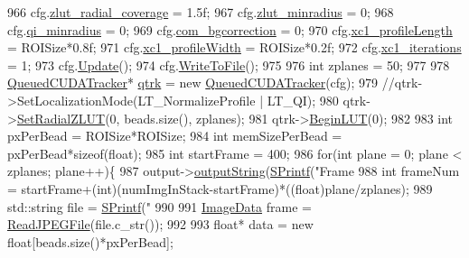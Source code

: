 \begin{DoxyCode}
{966     cfg.\hyperlink{struct_q_trk_settings_ae57544152a8a129bae6cb934feead1c7}{zlut\_radial\_coverage} = 1.5f;
967     cfg.\hyperlink{struct_q_trk_settings_a1a14537a9e784c65eed512e72ee86c02}{zlut\_minradius} = 0;
968     cfg.\hyperlink{struct_q_trk_settings_a7b5f3e61b4dcab6330c56e7bcd96e82d}{qi\_minradius} = 0;
969     cfg.\hyperlink{struct_q_trk_settings_a18ce353ffb049d1c86254a773a6fe49d}{com\_bgcorrection} = 0;
970     cfg.\hyperlink{struct_q_trk_settings_a8f38457c4ec183f78a0191b247ab6b51}{xc1\_profileLength} = ROISize*0.8f;
971     cfg.\hyperlink{struct_q_trk_settings_a80de240523eb79408593d26e6ef07ef7}{xc1\_profileWidth} = ROISize*0.2f;
972     cfg.\hyperlink{struct_q_trk_settings_a0bc4efdffbb8ad272d1c9facfdf0e171}{xc1\_iterations} = 1;
973     cfg.\hyperlink{struct_q_trk_computed_config_a26980879d30db548c6b2a2589616d7ee}{Update}();
974     cfg.\hyperlink{struct_q_trk_computed_config_a824634b46aeafc68c21d5951f92495c3}{WriteToFile}();
975 
976     \textcolor{keywordtype}{int} zplanes = 50;
977 
978     \hyperlink{class_queued_c_u_d_a_tracker}{QueuedCUDATracker}* \hyperlink{namespaceqtrk}{qtrk} = \textcolor{keyword}{new} \hyperlink{class_queued_c_u_d_a_tracker}{QueuedCUDATracker}(cfg);
979     \textcolor{comment}{//qtrk->SetLocalizationMode(LT\_NormalizeProfile | LT\_QI);}
980     qtrk->\hyperlink{class_queued_c_u_d_a_tracker_a2681f4f94ca93970322bafa58b1dd9bd}{SetRadialZLUT}(0, beads.size(), zplanes);
981     qtrk->\hyperlink{class_queued_c_u_d_a_tracker_ac6a9934c5a2bd06ecb503abace83c222}{BeginLUT}(0);
982 
983     \textcolor{keywordtype}{int} pxPerBead = ROISize*ROISize;
984     \textcolor{keywordtype}{int} memSizePerBead = pxPerBead*\textcolor{keyword}{sizeof}(float);
985     \textcolor{keywordtype}{int} startFrame = 400;
986     \textcolor{keywordflow}{for}(\textcolor{keywordtype}{int} plane = 0; plane < zplanes; plane++)\{
987         output->\hyperlink{classoutputter_ab83efb14176854f486bea2b514f39918}{outputString}(\hyperlink{utils_8cpp_aba26a6b64035ef7962a63b760dd9013e}{SPrintf}(\textcolor{stringliteral}{"Frame %
988         \textcolor{keywordtype}{int} frameNum = startFrame+(int)(numImgInStack-startFrame)*((float)plane/zplanes);
989         std::string file = \hyperlink{utils_8cpp_aba26a6b64035ef7962a63b760dd9013e}{SPrintf}(\textcolor{stringliteral}{"%
990         
991         \hyperlink{struct_t_image_data}{ImageData} frame = \hyperlink{fastjpg_8cpp_aca9c9daac87f0810622bb7e207e4587f}{ReadJPEGFile}(file.c\_str());
992 
993         \textcolor{keywordtype}{float}* data = \textcolor{keyword}{new} \textcolor{keywordtype}{float}[beads.size()*pxPerBead];
}}}
\end{DoxyCode}
